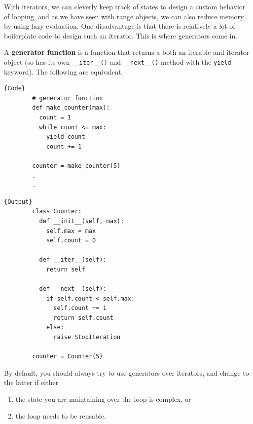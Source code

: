   With iterators, we can cleverly keep track of states to design a custom behavior of looping, and as we have seen with range objects, we can also reduce memory by using lazy evaluation. One disadvantage is that there is relatively a lot of boilerplate code to design such an iterator. This is where generators come in. 

  \begin{definition}[Generator]
    \label{def:generator}
    A \textbf{generator function} is a function that returns a both an iterable and iterator object (so has its own \texttt{\_\_iter\_\_()} and \texttt{\_\_next\_\_()} method with the \texttt{yield} keyword). The following are equivalent. 

    \noindent\begin{minipage}{.5\textwidth}
      \begin{lstlisting}[]{Code}
        # generator function
        def make_counter(max):
          count = 1
          while count <= max:
            yield count
            count += 1

        counter = make_counter(5) 
        .
        .
      \end{lstlisting}
      \end{minipage}
      \hfill
      \begin{minipage}{.49\textwidth}
      \begin{lstlisting}[]{Output}
        class Counter: 
          def __init__(self, max): 
            self.max = max
            self.count = 0

          def __iter__(self): 
            return self

          def __next__(self): 
            if self.count < self.max: 
              self.count += 1 
              return self.count 
            else: 
              raise StopIteration

        counter = Counter(5) 
      \end{lstlisting}
    \end{minipage}
  \end{definition} 

  By default, you should always try to use generators over iterators, and change to the latter if either 
  \begin{enumerate}
    \item the state you are maintaining over the loop is complex, or 
    \item the loop needs to be reusable.  
  \end{enumerate}
